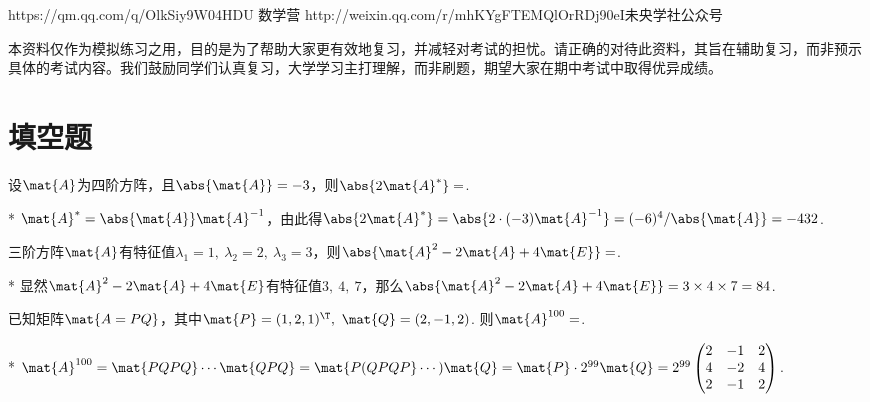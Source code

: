 {https://qm.qq.com/q/OlkSiy9W04}{HDU 数学营}
{http://weixin.qq.com/r/mhKYgFTEMQlOrRDj90eI}{未央学社公众号}
\begin{flushleft}
    \kaishu\qquad 本资料仅作为模拟练习之用，目的是为了帮助大家更有效地复习，并减轻对考试的担忧。请正确的对待此资料，其旨在辅助复习，而非预示具体的考试内容。我们鼓励同学们认真复习，大学学习主打理解，而非刷题，期望大家在期中考试中取得优异成绩。
\end{flushleft}

\section{填空题}
\begin{problem}[行列式及其运算]
    设$\mat{A}$为四阶方阵，且$\abs{\mat{A}}=-3$，则$\abs{2\mat{A}^*}=$.
\end{problem}
\begin{solution}*
    $\mat{A}^*=\abs{\mat{A}}\mat{A}^{-1}$，由此得$\abs{2\mat{A}^*}=\abs{2\cdot(-3)\mat{A}^{-1}}=(-6)^4/\abs{\mat{A}}=-432$.
\end{solution}

\begin{problem}[特征值及特征向量]
    三阶方阵$\mat{A}$有特征值$\lambda_1=1,\ \lambda_2=2,\ \lambda_3=3$，则$\abs{\mat{A}^2-2\mat{A}+4\mat{E}}=$.
\end{problem}
\begin{solution}*
    显然$\mat{A}^2-2\mat{A}+4\mat{E}$有特征值$3,\ 4,\ 7$，那么$\abs{\mat{A}^2-2\mat{A}+4\mat{E}}=3\times 4\times 7=84$.
\end{solution}

\begin{problem}[相似矩阵]
    已知矩阵$\mat{A=PQ}$，其中$\mat{P}=(1,2,1)^\T,\ 
    \mat{Q}=(2,-1,2)$. 则$\mat{A}^{100}=$.
\end{problem}
\begin{solution}*
    $\mat{A}^{100}=\mat{PQPQ}\cdots\mat{QPQ}=\mat{P(QPQP}\cdots)\mat{Q}=\mat{P}\cdot 2^{99}\mat{Q}=2^{99}\begin{pmatrix}
        2 & -1 & 2\\4 & -2 & 4\\ 2 & -1 & 2
    \end{pmatrix}$.
\end{solution}


